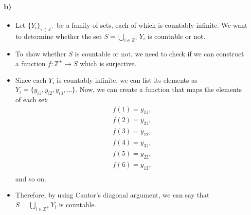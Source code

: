 \documentclass[12pt]{article}
\begin{document}
\paragraph*{b)}
\begin{itemize}
    \item Let $\{Y_i\}_{i \in \mathbb{Z}^+}$ be a family of sets, each of which is countably infinite. We want to determine whether the set $S = \bigcup_{i \in \mathbb{Z}^+} Y_i$ is countable or not.
    \item To show whether $S$ is countable or not, we need to check if we can construct a function $f: \mathbb{Z}^+ \rightarrow S$ which is surjective.
    \item Since each $Y_i$ is countably infinite, we can list its elements as $Y_i = \{y_{i1}, y_{i2}, y_{i3}, ...\}$. Now, we can create a function that maps the elements of each set:
    \begin{equation*}
        \begin{split}
            f(1) = y_{11},\\
            f(2) = y_{21},\\
            f(3) = y_{12},\\
            f(4) = y_{31},\\
            f(5) = y_{22},\\
            f(6) = y_{13},\\
        \end{split}
    \end{equation*}
    and so on.
    \item Therefore, by using Cantor's diagonal argument, we can say that $S = \bigcup_{i \in \mathbb{Z}^+} Y_i$ is countable.
\end{itemize}{}
\end{document}
